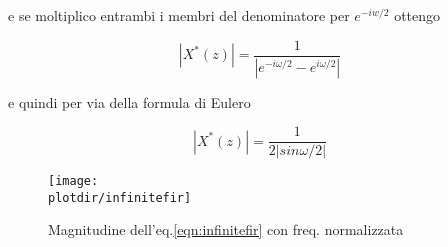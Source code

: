    e se moltiplico entrambi i membri del denominatore per $e^{-iw/2}$ ottengo

		 \begin{equation}
				 |X^{*}(z)| = \frac{1}{|e^{-i\omega/2} - e^{i\omega/2}|}
		 \end{equation}

   e quindi per via della formula di Eulero                 

	   \begin{equation}\label{eqn:infinitefir}
				 |X^{*}(z)| = \frac{1}{2 |sin {\omega/2}|}
		 \end{equation}
	\begin{figure}[htbp]	
		\begin{center}
			\texttt{[image: \\plotdir/infinitefir]}
			\caption{Magnitudine dell'eq.\ref{eqn:infinitefir} con freq.  normalizzata}
		\end{center}
	\end{figure}
